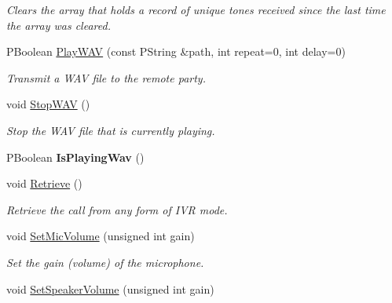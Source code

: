 \begin{CompactItemize}
\begin{CompactList}\small\item\em Clears the array that holds a record of unique tones received since the last time the array was cleared. \item\end{CompactList}\item 
PBoolean \hyperlink{classTelephonyIfc_1138529389af3b4712bd11fadd4836ca}{PlayWAV} (const PString \&path, int repeat=0, int delay=0)
\begin{CompactList}\small\item\em Transmit a WAV file to the remote party. \item\end{CompactList}\item 
\hypertarget{classTelephonyIfc_6bf03dc65c5128fc1b7c299a6e40740f}{
void \hyperlink{classTelephonyIfc_6bf03dc65c5128fc1b7c299a6e40740f}{StopWAV} ()}
\label{classTelephonyIfc_6bf03dc65c5128fc1b7c299a6e40740f}

\begin{CompactList}\small\item\em Stop the WAV file that is currently playing. \item\end{CompactList}\item 
\hypertarget{classTelephonyIfc_a471fa455406339841ed30bddedb7dab}{
PBoolean \textbf{IsPlayingWav} ()}
\label{classTelephonyIfc_a471fa455406339841ed30bddedb7dab}

\item 
\hypertarget{classTelephonyIfc_e5318586774b3cae6afd9bd3596ac0a6}{
void \hyperlink{classTelephonyIfc_e5318586774b3cae6afd9bd3596ac0a6}{Retrieve} ()}
\label{classTelephonyIfc_e5318586774b3cae6afd9bd3596ac0a6}

\begin{CompactList}\small\item\em Retrieve the call from any form of IVR mode. \item\end{CompactList}\item 
\hypertarget{classTelephonyIfc_9c7068e7f0ef2d4498272b4a20361d4c}{
void \hyperlink{classTelephonyIfc_9c7068e7f0ef2d4498272b4a20361d4c}{SetMicVolume} (unsigned int gain)}
\label{classTelephonyIfc_9c7068e7f0ef2d4498272b4a20361d4c}

\begin{CompactList}\small\item\em Set the gain (volume) of the microphone. \item\end{CompactList}\item 
\hypertarget{classTelephonyIfc_8cf9b680409dfad0e8453a93b1057af2}{
void \hyperlink{classTelephonyIfc_8cf9b680409dfad0e8453a93b1057af2}{SetSpeakerVolume} (unsigned int gain)}
\label{classTelephonyIfc_8cf9b680409dfad0e8453a93b1057af2}


\end{CompactItemize}
